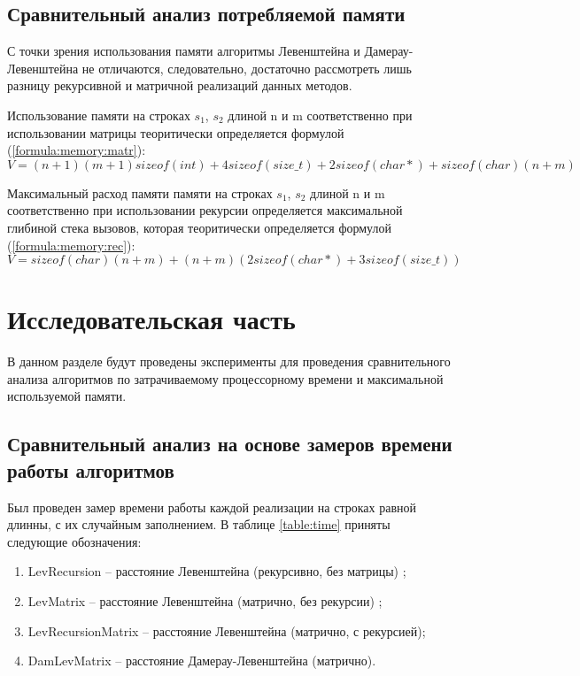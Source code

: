 \documentclass[utf8x, 12pt]{G7-32}
\begin{document}
    \section{Сравнительный анализ потребляемой памяти}  
        С точки зрения использования памяти алгоритмы Левенштейна и
        Дамерау-Левенштейна не отличаются, следовательно, достаточно
        рассмотреть лишь разницу рекурсивной и матричной реализаций
        данных методов.
        
        Использование памяти на строках $s_1$, $s_2$ длиной n и m соответственно
        при использовании матрицы теоритически определяется формулой (\ref{formula:memory:matr}):
        \begin{equation}
            V = (n + 1)(m + 1)sizeof(int) + 4sizeof(size\_t) + 2sizeof(char*) + sizeof(char)(n + m)
            \label{formula:memory:matr}
        \end{equation}
        

        Максимальный расход памяти памяти на строках $s_1$, $s_2$ длиной n и m соответственно
        при использовании рекурсии определяется максимальной глибиной стека вызовов,
        которая теоритически определяется формулой (\ref{formula:memory:rec}):
        \begin{equation}
            V = sizeof(char)(n + m)  + (n + m)(2sizeof(char*) + 3sizeof(size\_t))
            \label{formula:memory:rec}
        \end{equation}




\chapter{Исследовательская часть}
    В данном разделе будут проведены эксперименты для проведения 
    сравнительного анализа алгоритмов по затрачиваемому процессорному 
    времени\cite{link2} и максимальной используемой памяти.

\section{Сравнительный анализ на основе замеров времени работы алгоритмов}

Был проведен замер времени работы каждой реализации на строках равной длинны, с их случайным заполнением.
В таблице \ref{table:time} приняты следующие обозначения:\begin{enumerate}
            \item LevRecursion -- расстояние Левенштейна (рекурсивно, без матрицы) ;
            \item LevMatrix -- расстояние Левенштейна (матрично, без рекурсии) ;
            \item LevRecursionMatrix -- расстояние Левенштейна (матрично, с рекурсией);
	    \item DamLevMatrix -- расстояние Дамерау-Левенштейна (матрично).
        \end{enumerate}
\end{document}

